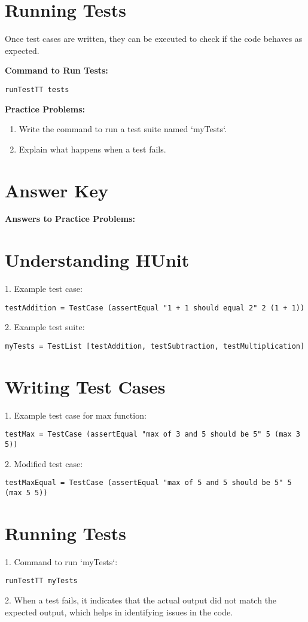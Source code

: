 \documentclass{article}
\begin{document}
\section*{Running Tests}
Once test cases are written, they can be executed to check if the code behaves as expected. 

\textbf{Command to Run Tests:}
\begin{verbatim}
runTestTT tests
\end{verbatim}

\textbf{Practice Problems:}
\begin{enumerate}
    \item Write the command to run a test suite named `myTests`.
    \item Explain what happens when a test fails.
\end{enumerate}

\section*{Answer Key}
\textbf{Answers to Practice Problems:}

\section*{Understanding HUnit}
1. Example test case:
\begin{verbatim}
testAddition = TestCase (assertEqual "1 + 1 should equal 2" 2 (1 + 1))
\end{verbatim}
2. Example test suite:
\begin{verbatim}
myTests = TestList [testAddition, testSubtraction, testMultiplication]
\end{verbatim}

\section*{Writing Test Cases}
1. Example test case for max function:
\begin{verbatim}
testMax = TestCase (assertEqual "max of 3 and 5 should be 5" 5 (max 3 5))
\end{verbatim}
2. Modified test case:
\begin{verbatim}
testMaxEqual = TestCase (assertEqual "max of 5 and 5 should be 5" 5 (max 5 5))
\end{verbatim}

\section*{Running Tests}
1. Command to run `myTests`:
\begin{verbatim}
runTestTT myTests
\end{verbatim}
2. When a test fails, it indicates that the actual output did not match the expected output, which helps in identifying issues in the code.
\end{document}
